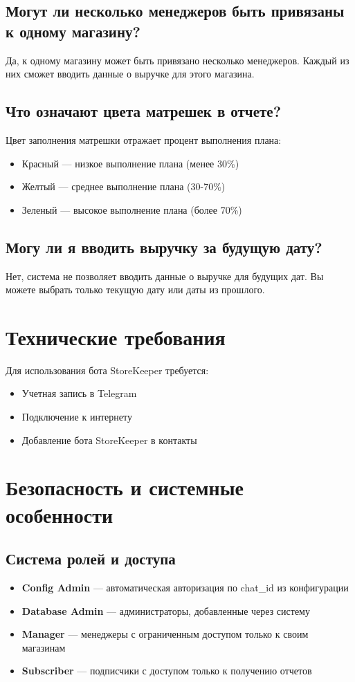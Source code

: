 \documentclass[a4paper,12pt]{article}
\begin{document}
\subsection{Могут ли несколько менеджеров быть привязаны к одному магазину?}
Да, к одному магазину может быть привязано несколько менеджеров. Каждый из них сможет вводить данные о выручке для этого магазина.

\subsection{Что означают цвета матрешек в отчете?}
Цвет заполнения матрешки отражает процент выполнения плана:
\begin{itemize}
    \item Красный — низкое выполнение плана (менее 30\%)
    \item Желтый — среднее выполнение плана (30-70\%)
    \item Зеленый — высокое выполнение плана (более 70\%)
\end{itemize}

\subsection{Могу ли я вводить выручку за будущую дату?}
Нет, система не позволяет вводить данные о выручке для будущих дат. Вы можете выбрать только текущую дату или даты из прошлого.

\section{Технические требования}

Для использования бота StoreKeeper требуется:
\begin{itemize}
    \item Учетная запись в Telegram
    \item Подключение к интернету
    \item Добавление бота StoreKeeper в контакты
\end{itemize}

\section{Безопасность и системные особенности}

\subsection{Система ролей и доступа}
\begin{itemize}
    \item \textbf{Config Admin} — автоматическая авторизация по chat\_id из конфигурации
    \item \textbf{Database Admin} — администраторы, добавленные через систему
    \item \textbf{Manager} — менеджеры с ограниченным доступом только к своим магазинам
    \item \textbf{Subscriber} — подписчики с доступом только к получению отчетов
\end{itemize}
\end{document}
